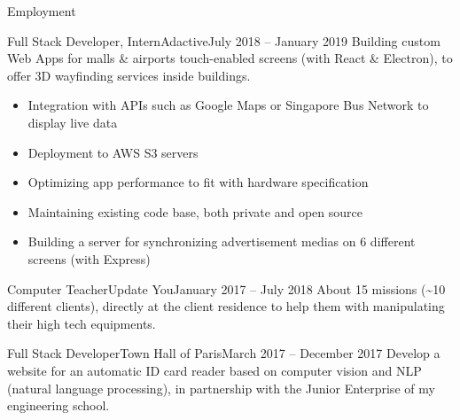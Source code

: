 \documentclass[]{mcdowellcv}
\begin{document}
    \makeheader

    \begin{cvsection}{Employment}

        \begin{cvsubsection}{Full Stack Developer, Intern}{Adactive}{July 2018 -- January 2019}
            Building custom Web Apps for malls \& airports touch-enabled screens (with React \& Electron), to offer 3D wayfinding services inside buildings.
            \begin{itemize}
                \item Integration with APIs such as Google Maps or Singapore Bus Network to display live data
                \item Deployment to AWS S3 servers
                \item Optimizing app performance to fit with hardware specification
                \item Maintaining existing code base, both private and open source
                \item Building a server for synchronizing advertisement medias on 6 different screens (with Express)
            \end{itemize}
        \end{cvsubsection}

        \begin{cvsubsection}{Computer Teacher}{Update You}{January 2017 -- July 2018}
            About 15 missions (\textasciitilde 10 different clients), directly at the client residence to help them with manipulating their high tech equipments.
        \end{cvsubsection}

        \begin{cvsubsection}{Full Stack Developer}{Town Hall of Paris}{March 2017 -- December 2017}
            Develop a website for an automatic ID card reader based on computer vision and NLP (natural language processing), in partnership with the Junior Enterprise of my engineering school.
        \end{cvsubsection}

    \end{cvsection}
\end{document}

